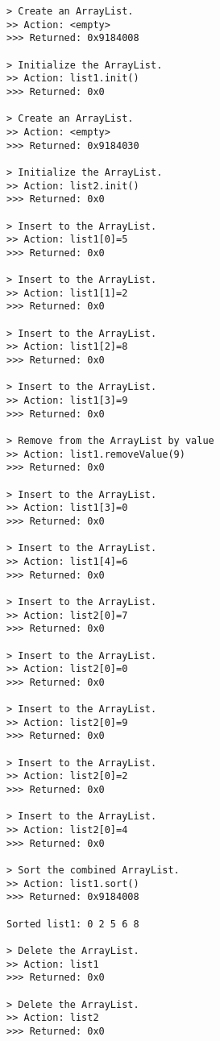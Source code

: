 \documentclass[a4paper]{article}
\begin{document}
\begin{CJK*}{UTF8}{gbsn}
\begin{verbatim}
> Create an ArrayList.
>> Action: <empty>
>>> Returned: 0x9184008

> Initialize the ArrayList.
>> Action: list1.init()
>>> Returned: 0x0

> Create an ArrayList.
>> Action: <empty>
>>> Returned: 0x9184030

> Initialize the ArrayList.
>> Action: list2.init()
>>> Returned: 0x0

> Insert to the ArrayList.
>> Action: list1[0]=5
>>> Returned: 0x0

> Insert to the ArrayList.
>> Action: list1[1]=2
>>> Returned: 0x0

> Insert to the ArrayList.
>> Action: list1[2]=8
>>> Returned: 0x0

> Insert to the ArrayList.
>> Action: list1[3]=9
>>> Returned: 0x0

> Remove from the ArrayList by value
>> Action: list1.removeValue(9)
>>> Returned: 0x0

> Insert to the ArrayList.
>> Action: list1[3]=0
>>> Returned: 0x0

> Insert to the ArrayList.
>> Action: list1[4]=6
>>> Returned: 0x0

> Insert to the ArrayList.
>> Action: list2[0]=7
>>> Returned: 0x0

> Insert to the ArrayList.
>> Action: list2[0]=0
>>> Returned: 0x0

> Insert to the ArrayList.
>> Action: list2[0]=9
>>> Returned: 0x0

> Insert to the ArrayList.
>> Action: list2[0]=2
>>> Returned: 0x0

> Insert to the ArrayList.
>> Action: list2[0]=4
>>> Returned: 0x0

> Sort the combined ArrayList.
>> Action: list1.sort()
>>> Returned: 0x9184008

Sorted list1: 0 2 5 6 8

> Delete the ArrayList.
>> Action: list1
>>> Returned: 0x0

> Delete the ArrayList.
>> Action: list2
>>> Returned: 0x0
    \end{verbatim}

\clearpage
\end{CJK*}
\end{document}
